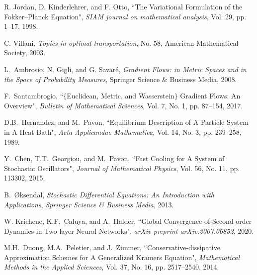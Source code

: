 \documentclass[10pt,twocolumn]{IEEEtran}
\begin{document}
\begin{thebibliography}{99}

R. Jordan, D. Kinderlehrer, and F. Otto, ``The Variational Formulation of the Fokker--Planck Equation", \emph{SIAM journal on mathematical analysis}, Vol. 29, pp. 1--17, 1998.

C. Villani, \emph{Topics in optimal transportation}, No. 58, American Mathematical Society, 2003.

L.~Ambrosio, N. Gigli, and G. Savar{\'e}, \emph{Gradient Flows: in Metric Spaces and in the Space of Probability Measures}, Springer Science \& Business Media, 2008.

F.~Santambrogio, ``$\{$Euclidean, Metric, and Wasserstein$\}$ Gradient Flows: An Overview", \emph{Bulletin of Mathematical Sciences}, Vol. 7, No. 1, pp. 87--154, 2017. 


D.B.~Hernandez, and M.~Pavon, ``Equilibrium Description of A Particle System in A Heat Bath", \emph{Acta Applicandae Mathematica}, Vol. 14, No. 3, pp. 239--258, 1989.

Y.~Chen, T.T.~Georgiou, and M.~Pavon, ``Fast Cooling for A System of Stochastic Oscillators", \emph{Journal of Mathematical Physics}, Vol. 56, No. 11, pp. 113302, 2015.


B.~\O{}ksendal, \emph{Stochastic Differential Equations: An Introduction with Applications}, \emph{Springer Science \& Business Media}, 2013.


W. Krichene, K.F.~Caluya, and A.~Halder, ``Global Convergence of Second-order Dynamics in Two-layer Neural Networks", \emph{arXiv preprint arXiv:2007.06852}, 2020.


M.H.~Duong, M.A.~Peletier, and J.~Zimmer, ``Conservative-dissipative Approximation Schemes for A Generalized Kramers Equation", \emph{Mathematical Methods in the Applied Sciences}, Vol. 37, No. 16, pp. 2517--2540, 2014.

	
\end{thebibliography}
\end{document}
